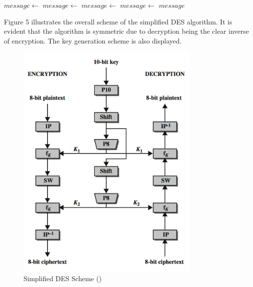 \documentclass[]{article}
\begin{document}
\vspace{0.5cm}
\begin{algorithmic}
	
	\State $message\gets $ 
	\State $message\gets $ 
	\State {}	
	\State $message\gets $ 	
	\State $message\gets $ 
	\State \Return $message$
	\EndFunction
\end{algorithmic}

\newpage
\noindent
Figure 5 illustrates the overall scheme of the simplified DES algorithm. It is evident that the algorithm is symmetric due to decryption being the clear inverse of encryption. The key generation scheme is also displayed.

\begin{figure}[H]
	\begin{center}
		\includegraphics[height=0.8\textheight,width=0.8\textwidth]{sdes_scheme.png}
		\caption{Simplified DES Scheme (\cite{maintext})}
		\label{fig:des_scheme}		
	\end{center}
\end{figure}
\end{document}
